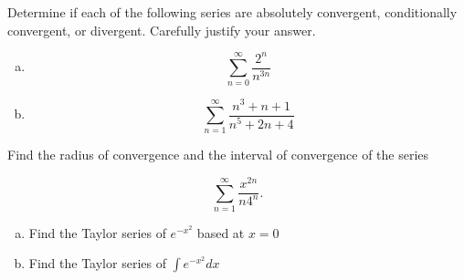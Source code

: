 \documentclass[11pt]{exam}
\theoremstyle{definition}
\begin{document}
\begin{questions}
Determine if each of the following series are absolutely convergent, conditionally convergent, or divergent.
Carefully justify your answer.

\begin{enumerate}[(a)]
\item  $$\sum_{n=0}^\infty \frac{2^n}{n^{3n}}$$
\vspace{3in}
\item  $$\sum_{n=1}^\infty \frac{n^3+n+1}{n^5+2n+4}$$
\end{enumerate}

\newpage
\question[10]\mbox{} 

Find the radius of convergence and the interval of convergence of the series

$$\sum_{n=1}^\infty \frac{x^{2n}}{n4^n}.$$

\newpage
\question[10]\mbox{} 


\begin{enumerate}[(a)]
\item  Find the Taylor series of $e^{-x^2}$ based at $x=0$
\vspace{4in}
\item  Find the Taylor series of $\int e^{-x^2}dx$
\end{enumerate}



\end{questions}
\end{document}
